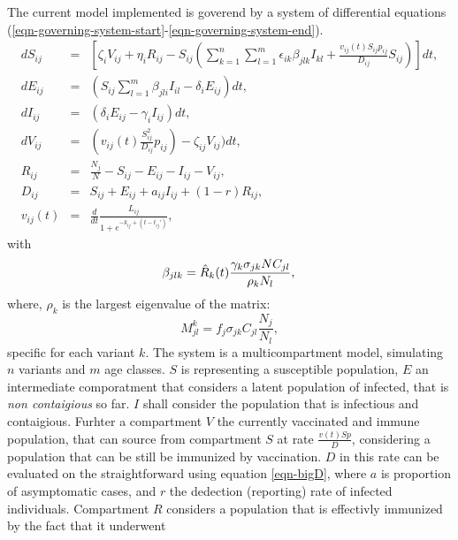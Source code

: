 \documentclass[a4paper,12pt]{article}
\begin{document}
The current model implemented is goverend by a system of differential
equations (\ref{eqn-governing-system-start}-\ref{eqn-governing-system-end}).
\begin{eqnarray}
  dS_{ij} &=&
  \left[\zeta_{i}V_{ij}+\eta_{i}R_{ij}-S_{ij}\left(\sum_{k=1}^n
    \sum_{l=1}^m
    \epsilon_{ik}\beta_{jlk}I_{kl}+\frac{v_{ij}(t)S_{ij}p_{ij}}{D_{ij}}S_{ij}\right)
    \right]dt,
  \label{eqn-governing-system-start}
  \\
  dE_{ij} &=& \left(S_{ij} \sum_{l=1}^m\beta_{jli}I_{il}-\delta_i
  E_{ij}\right)dt, \label{eqn-bigE}\\
  dI_{ij} &=& (\delta_i E_{ij} - \gamma_i I_{ij})dt, \label{eqn-bigI} \\
  dV_{ij} &=& (v_{ij}(t)\frac{S^2_{ij}}{D_{ij}}p_{ij})-\zeta_{ij}V_{ij})dt, \\
  R_{ij} &=& \frac{N_j}{N}-S_{ij}-E_{ij}-I_{ij}-V_{ij}, \label{eqn-bigR} \\
  D_{ij} &=& S_{ij} + E_{ij} + a_{ij}I_{ij}+\left(1 -
  r\right)R_{ij}, \label{eqn-bigD} \\
  v_{ij}(t) &=& \frac{d}{dt}\frac{L_{ij}}{1+e^{-k_{ij}+(t-t_{ij}')}},
  \label{eqn-governing-system-end}
\end{eqnarray}
with 
\begin{equation}
  \beta_{jlk} = \hat{R}_k(t)\frac{\gamma_k\sigma_{jk} N C_{jl}}{\rho_k N_l},
  \label{eqn-beta}\\
\end{equation}
where, $\rho_k$ is the largest eigenvalue of the matrix:
\begin{equation}
  M^k_{jl}=f_{j}\sigma_{jk}C_{jl}\frac{N_j}{N_l}, \label{eqn-beta-suppl}
\end{equation}
specific for each variant $k$. 
The system is a multicompartment model, simulating $n$ variants and
$m$ age classes. $S$ is representing a susceptible
population, $E$ an intermediate comporatment that considers a latent
population of infected, that is \emph{non contaigious} so far. $I$ shall
consider the population that is infectious and contaigious. Furhter a
compartment $V$ the currently vaccinated and immune population, that
can source from compartment $S$ at rate $\frac{v(t)S p}{D}$,
considering a population that can be still be immunized by
vaccination. $D$ in this rate can be evaluated on the straightforward using
equation \ref{eqn-bigD}, where $a$ is proportion of asymptomatic
cases, and $r$ the dedection (reporting) rate of infected individuals.
Compartment $R$ considers a
population that is effectivly immunized by the fact that it underwent
\end{document}
